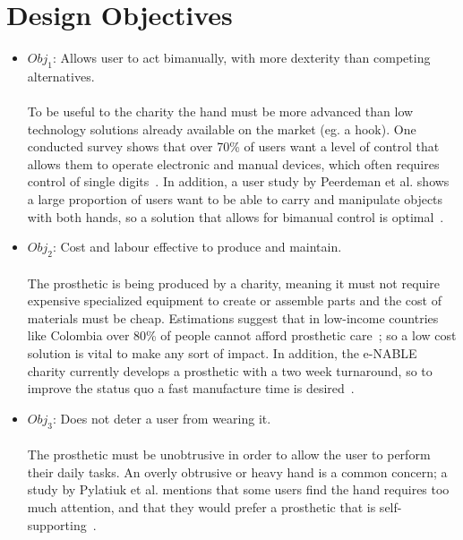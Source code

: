 \documentclass[12pt,3p]{elsarticle}
\begin{document}
\section{Design Objectives}
\label{sec1}
\begin{itemize}
\item $Obj_1$: Allows user to act bimanually, with more dexterity than competing alternatives. \\\\
To be useful to the charity the hand must be more advanced than low technology
solutions already available on the market (eg. a hook). One conducted survey shows that over 70\% of users
want a level of control that allows them to operate electronic and manual devices,
which often requires control of single digits~\cite{Pylatiuk}. In addition, a
user study by Peerdeman et al. shows a large proportion of users want to be able to 
carry and manipulate objects with both hands, so
a solution that allows for bimanual control is optimal~\cite{Peerdeman}.
\item $Obj_2$: Cost and labour effective to produce and maintain. \\\\
The prosthetic is being produced by a charity, meaning it must not require expensive
specialized equipment to create or assemble parts and the cost of materials must
be cheap. Estimations suggest that in low-income countries like Colombia over 80\%
of people cannot afford prosthetic care~\cite{Slade}; so a low cost solution is vital to make any
sort of impact. In addition, the e-NABLE charity currently develops a prosthetic with
a two week turnaround, so to improve the status quo a fast manufacture time is
desired~\cite{Walbran}.\pagebreak
\item $Obj_3$: Does not deter a user from wearing it. \\\\
The prosthetic must be unobtrusive in order to allow the user to perform their
daily tasks. An overly obtrusive or heavy hand is a common concern; a study by
Pylatiuk et al. mentions that some users find the hand requires too much attention,
and that they would prefer a prosthetic that is self-supporting~\cite{Pylatiuk}.

\end{itemize}

\end{document}
